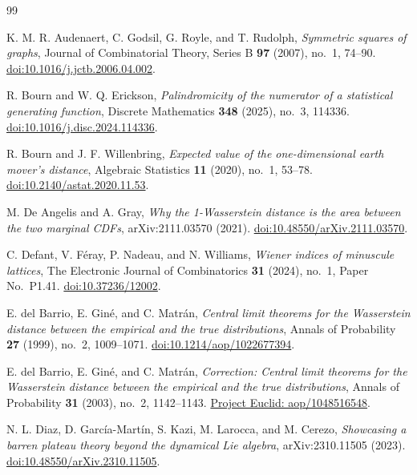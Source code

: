 \documentclass[twoside,10pt]{article}
\numberwithin{equation}{section}
\theoremstyle{slbody}
\theoremstyle{definition}
\theoremstyle{remark}
\newcommand{\1}{\mathbf{1}}
\begin{document}
\begin{thebibliography}{99}
\footnotesize\raggedright

K. M. R. Audenaert, C. Godsil, G. Royle, and T. Rudolph,
\emph{Symmetric squares of graphs},
Journal of Combinatorial Theory, Series B \textbf{97} (2007), no.~1, 74--90.
\href{https://doi.org/10.1016/j.jctb.2006.04.002}%
{doi:10.1016/j.jctb.2006.04.002}.

R. Bourn and W. Q. Erickson,
\emph{Palindromicity of the numerator of a statistical generating function},
Discrete Mathematics \textbf{348} (2025), no.~3, 114336.
\href{https://doi.org/10.1016/j.disc.2024.114336}%
{doi:10.1016/j.disc.2024.114336}.

R. Bourn and J. F. Willenbring,
\emph{Expected value of the one-dimensional earth mover's distance},
Algebraic Statistics \textbf{11} (2020), no.~1, 53--78.
\href{https://doi.org/10.2140/astat.2020.11.53}%
{doi:10.2140/astat.2020.11.53}.

M. De Angelis and A. Gray,
\emph{Why the 1-Wasserstein distance is the area between the two marginal
CDFs}, arXiv:2111.03570 (2021).
\href{https://doi.org/10.48550/arXiv.2111.03570}{doi:10.48550/arXiv.2111.03570}.

C. Defant, V. F\'eray, P. Nadeau, and N. Williams,
\emph{Wiener indices of minuscule lattices},
The Electronic Journal of Combinatorics \textbf{31} (2024), no.~1,
Paper No.~P1.41.
\href{https://doi.org/10.37236/12002}{doi:10.37236/12002}.

E. del Barrio, E. Gin\'e, and C. Matr\'an,
\emph{Central limit theorems for the Wasserstein distance between the empirical
and the true distributions},
Annals of Probability \textbf{27} (1999), no.~2, 1009--1071.
\href{https://doi.org/10.1214/aop/1022677394}{doi:10.1214/aop/1022677394}.

E. del Barrio, E. Gin\'e, and C. Matr\'an,
\emph{Correction: Central limit theorems for the Wasserstein distance between
the empirical and the true distributions},
Annals of Probability \textbf{31} (2003), no.~2, 1142--1143.
\href{https://projecteuclid.org/journals/annals-of-probability/volume-31/issue-2/Correction--Central-limit-theorems-for-the-Wasserstein-distance-between/aop/1048516548.pdf}%
{Project Euclid: aop/1048516548}.

N. L. Diaz, D. Garc\'ia-Mart\'in, S. Kazi, M. Larocca, and M. Cerezo,
\emph{Showcasing a barren plateau theory beyond the dynamical Lie algebra},
arXiv:2310.11505 (2023).
\href{https://doi.org/10.48550/arXiv.2310.11505}%
{doi:10.48550/arXiv.2310.11505}.


\end{thebibliography}
\end{document}
